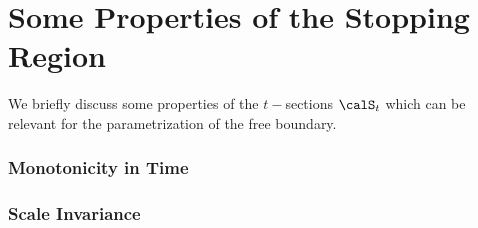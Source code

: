 \setcounter{section}{0}
\renewcommand*{\thesection}{\arabic{chapter}.\Alph{section}}

\section{Some Properties of the Stopping Region}
We briefly discuss some properties of the $t-$sections $\calS_t$ which can be relevant for the parametrization of the free boundary. 



\subsubsection{Monotonicity in Time}


\subsubsection{Scale Invariance}


\renewcommand*{\thesection}{\arabic{chapter}.\arabic{section}}